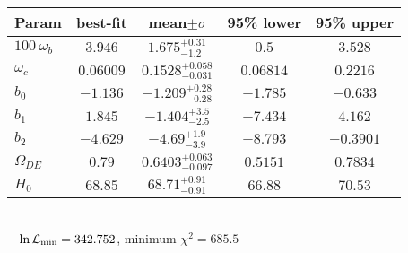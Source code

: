 \begin{tabular}{|l|c|c|c|c|} 
 \hline 
Param & best-fit & mean$\pm\sigma$ & 95\% lower & 95\% upper \\ \hline 
$100~\omega_{b }$ &$3.946$ & $1.675_{-1.2}^{+0.31}$ & $0.5$ & $3.528$ \\ 
$\omega_c$ &$0.06009$ & $0.1528_{-0.031}^{+0.058}$ & $0.06814$ & $0.2216$ \\ 
$b_{0 }$ &$-1.136$ & $-1.209_{-0.28}^{+0.28}$ & $-1.785$ & $-0.633$ \\ 
$b_{1 }$ &$1.845$ & $-1.404_{-2.5}^{+3.5}$ & $-7.434$ & $4.162$ \\ 
$b_{2 }$ &$-4.629$ & $-4.69_{-3.9}^{+1.9}$ & $-8.793$ & $-0.3901$ \\ 
$\Omega_{DE}$ &$0.79$ & $0.6403_{-0.097}^{+0.063}$ & $0.5151$ & $0.7834$ \\ 
$H_{0 }$ &$68.85$ & $68.71_{-0.91}^{+0.91}$ & $66.88$ & $70.53$ \\ 
\hline 
 \end{tabular} \\ 
$-\ln{\cal L}_\mathrm{min} =342.752$, minimum $\chi^2=685.5$ \\ 
